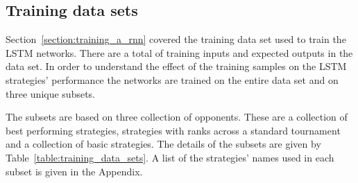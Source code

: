 \subsection{Training data sets}

Section~\ref{section:training_a_rnn} covered the training data set used to train
the LSTM networks. There are a total of \trainingpoint training inputs and expected
outputs in the data set. In order to understand the effect of the training
samples on the LSTM strategies' performance the networks are trained on the
entire data set and on three unique subsets.

The subsets are based on three collection of opponents. These are a collection
of best performing strategies, strategies with ranks across a standard
tournament and a collection of basic strategies. The details of the subsets are
given by Table~\ref{table:training_data_sets}.
A list of the strategies' names used in each subset is given in the Appendix. %

\begin{table}[htb]
    \centering
    \caption{Training data sets used to train the LSTM networks. The IPD
    standard tournament with the 218 opponent has been carried out using APL version
    3.10.0. The results are available at~\cite{std_tournament_results}.}\label{table:training_data_sets}
\end{table}

